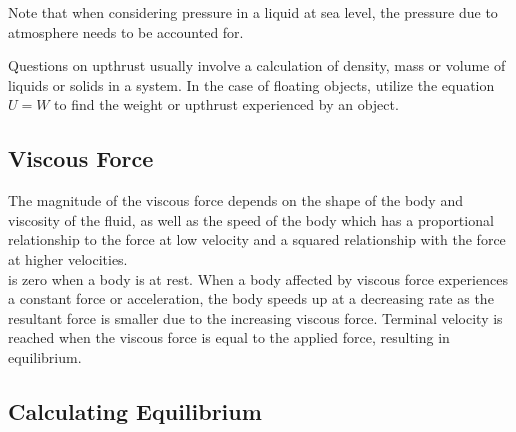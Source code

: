 \documentclass[../main]{subfiles}
\begin{document}
	Note that when considering pressure in a liquid at sea level, the pressure due to atmosphere needs to be accounted for.




	Questions on upthrust usually involve a calculation of density, mass or volume of liquids or solids in a system. In the case of floating objects, utilize the equation \(U = W\) to find the weight or upthrust experienced by an object.

	\subsection{Viscous Force}


	The magnitude of the viscous force depends on the shape of the body and viscosity of the fluid, as well as the speed of the body which has a proportional relationship to the force at low velocity and a squared relationship with the force at higher velocities. \\

	 is zero when a body is at rest. When a body affected by viscous force experiences a constant force or acceleration, the body speeds up at a decreasing rate as the resultant force is smaller due to the increasing viscous force. Terminal velocity is reached when the viscous force is equal to the applied force, resulting in equilibrium.


	\subsection{Calculating Equilibrium}
\end{document}
